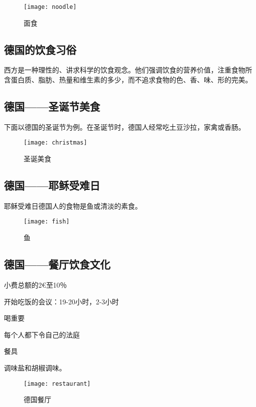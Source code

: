 \begin{figure}[htb]
    \centering
    \texttt{[image: noodle]}
    \caption{面食}
\end{figure}

\subsection{德国的饮食习俗}
    西方是一种理性的、讲求科学的饮食观念。他们强调饮食的营养价值，注重食物所含蛋白质、脂肪、热量和维生素的多少，而不追求食物的色、香、味、形的完美。

\subsection{德国——圣诞节美食}
    下面以德国的圣诞节为例。在圣诞节时，德国人经常吃土豆沙拉，家禽或香肠。

    \begin{figure}[htb]
        \centering
        \texttt{[image: christmas]}
        \caption{圣诞美食}
    \end{figure}  

\subsection{德国——耶稣受难日}
    耶稣受难日德国人的食物是鱼或清淡的素食。 

    \begin{figure}[htb]
        \centering
        \texttt{[image: fish]}
        \caption{鱼}
    \end{figure}  

\subsection{德国——餐厅饮食文化}

\item 小费总额的2€至10％ 
\item 开始吃饭的会议：19-20小时，2-3小时 
\item 喝重要 
\item 每个人都下令自己的法庭 
\item 餐具 
\item 调味盐和胡椒调味。

\begin{figure}[htb]
    \centering
    \texttt{[image: restaurant]}
    \caption{德国餐厅}
\end{figure} 
